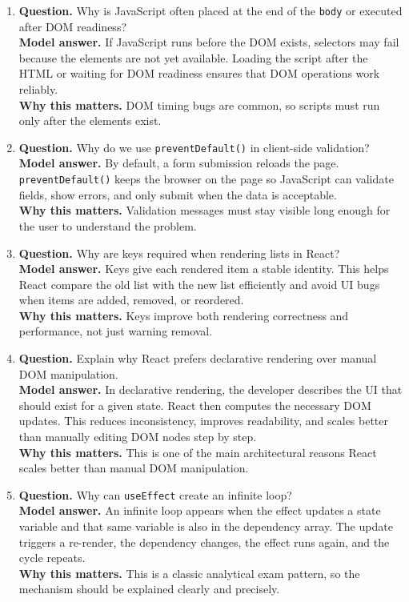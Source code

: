 \documentclass[11pt,a4paper]{article}
\begin{document}
\begin{enumerate}
  \item \textbf{Question.} Why is JavaScript often placed at the end of the \texttt{body} or executed after DOM readiness?\\
  \textbf{Model answer.} If JavaScript runs before the DOM exists, selectors may fail because the elements are not yet available. Loading the script after the HTML or waiting for DOM readiness ensures that DOM operations work reliably.\\
  \textbf{Why this matters.} DOM timing bugs are common, so scripts must run only after the elements exist.

  \item \textbf{Question.} Why do we use \texttt{preventDefault()} in client-side validation?\\
  \textbf{Model answer.} By default, a form submission reloads the page. \texttt{preventDefault()} keeps the browser on the page so JavaScript can validate fields, show errors, and only submit when the data is acceptable.\\
  \textbf{Why this matters.} Validation messages must stay visible long enough for the user to understand the problem.

  \item \textbf{Question.} Why are keys required when rendering lists in React?\\
  \textbf{Model answer.} Keys give each rendered item a stable identity. This helps React compare the old list with the new list efficiently and avoid UI bugs when items are added, removed, or reordered.\\
  \textbf{Why this matters.} Keys improve both rendering correctness and performance, not just warning removal.

  \item \textbf{Question.} Explain why React prefers declarative rendering over manual DOM manipulation.\\
  \textbf{Model answer.} In declarative rendering, the developer describes the UI that should exist for a given state. React then computes the necessary DOM updates. This reduces inconsistency, improves readability, and scales better than manually editing DOM nodes step by step.\\
  \textbf{Why this matters.} This is one of the main architectural reasons React scales better than manual DOM manipulation.

  \item \textbf{Question.} Why can \texttt{useEffect} create an infinite loop?\\
  \textbf{Model answer.} An infinite loop appears when the effect updates a state variable and that same variable is also in the dependency array. The update triggers a re-render, the dependency changes, the effect runs again, and the cycle repeats.\\
  \textbf{Why this matters.} This is a classic analytical exam pattern, so the mechanism should be explained clearly and precisely.


\end{enumerate}
\end{document}
